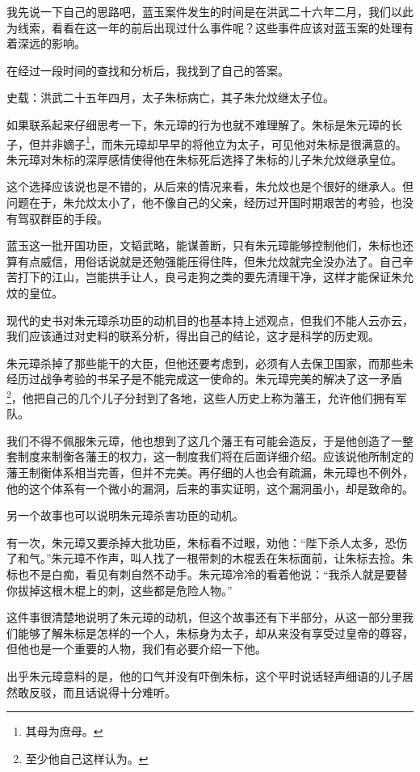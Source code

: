 \begin{multicols}{\theparacolNo}
		我先说一下自己的思路吧，蓝玉案件发生的时间是在洪武二十六年二月，我们以此为线索，看看在这一年的前后出现过什么事件呢？这些事件应该对蓝玉案的处理有着深远的影响。

		在经过一段时间的查找和分析后，我找到了自己的答案。

		史载：洪武二十五年四月，太子朱标病亡，其子朱允炆继太子位。

		如果联系起来仔细思考一下，朱元璋的行为也就不难理解了。朱标是朱元璋的长子，但并非嫡子\footnote{其母为庶母。}，而朱元璋却早早的将他立为太子，可见他对朱标是很满意的。朱元璋对朱标的深厚感情使得他在朱标死后选择了朱标的儿子朱允炆继承皇位。

		这个选择应该说也是不错的，从后来的情况来看，朱允炆也是个很好的继承人。但问题在于，朱允炆太小了，他不像自己的父亲，经历过开国时期艰苦的考验，也没有驾驭群臣的手段。

		蓝玉这一批开国功臣，文韬武略，能谋善断，只有朱元璋能够控制他们，朱标也还算有点威信，用俗话说就是还勉强能压得住阵，但朱允炆就完全没办法了。自己辛苦打下的江山，岂能拱手让人，良弓走狗之类的要先清理干净，这样才能保证朱允炆的皇位。

		现代的史书对朱元璋杀功臣的动机目的也基本持上述观点，但我们不能人云亦云，我们应该通过对史料的联系分析，得出自己的结论，这才是科学的历史观。

		朱元璋杀掉了那些能干的大臣，但他还要考虑到，必须有人去保卫国家，而那些未经历过战争考验的书呆子是不能完成这一使命的。朱元璋完美的解决了这一矛盾\footnote{至少他自己这样认为。}，他把自己的几个儿子分封到了各地，这些人历史上称为藩王，允许他们拥有军队。

		我们不得不佩服朱元璋，他也想到了这几个藩王有可能会造反，于是他创造了一整套制度来制衡各藩王的权力，这一制度我们将在后面详细介绍。应该说他所制定的藩王制衡体系相当完善，但并不完美。再仔细的人也会有疏漏，朱元璋也不例外，他的这个体系有一个微小的漏洞，后来的事实证明，这个漏洞虽小，却是致命的。

		另一个故事也可以说明朱元璋杀害功臣的动机。

		有一次，朱元璋又要杀掉大批功臣，朱标看不过眼，劝他：“陛下杀人太多，恐伤了和气。”朱元璋不作声，叫人找了一根带刺的木棍丢在朱标面前，让朱标去捡。朱标也不是白痴，看见有刺自然不动手。朱元璋冷冷的看着他说：“我杀人就是要替你拔掉这根木棍上的刺，这些都是危险人物。”

		这件事很清楚地说明了朱元璋的动机，但这个故事还有下半部分，从这一部分里我们能够了解朱标是怎样的一个人，朱标身为太子，却从来没有享受过皇帝的尊容，但他也是一个重要的人物，我们有必要介绍一下他。

		出乎朱元璋意料的是，他的口气并没有吓倒朱标，这个平时说话轻声细语的儿子居然敢反驳，而且话说得十分难听。


\end{multicols}

